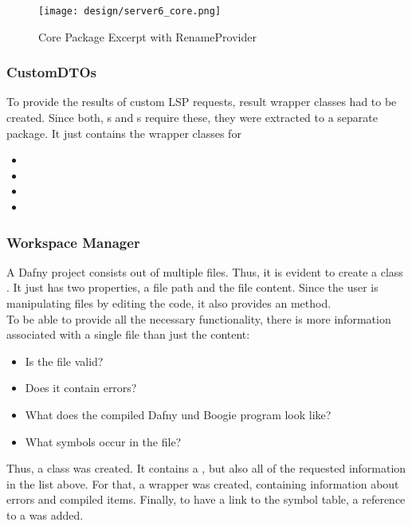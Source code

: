 \begin{figure}[h]
    \centering
    \texttt{[image: design/server6\_core.png]}
    \caption{Core Package Excerpt with RenameProvider}
    \label{fig:server_core}
\end{figure}

\subsubsection{CustomDTOs}
To provide the results of custom LSP requests, result wrapper classes had to be created.
Since both, s and s require these, they were extracted to a separate package.
It just contains the wrapper classes for
\begin{itemize}
    \item {}
    \item {}
    \item {}
    \item {}
\end{itemize}

\subsubsection{Workspace Manager}
A Dafny project consists out of multiple  files.
Thus, it is evident to create a class .
It just has two properties, a file path and the file content.
Since the user is manipulating files by editing the code, it also provides an  method.\\

To be able to provide all the necessary functionality, there is more information associated with a single file than just the content:
\begin{itemize}
    \item Is the file valid?
    \item Does it contain errors?
    \item What does the compiled Dafny und Boogie program look like?
    \item What symbols occur in the file?
\end{itemize}

Thus, a class  was created.
It contains a , but also all of the requested information in the list above.
For that, a wrapper  was created, containing information about errors and compiled items.
Finally, to have a link to the symbol table, a reference to a  was added.\\

